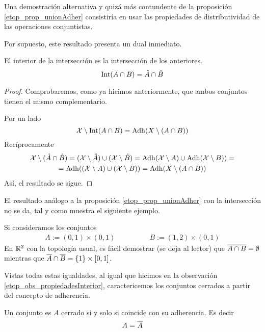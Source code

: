 \begin{obs}
	Una demostración alternativa y quizá más contundente de la proposición \ref{etop_prop_unionAdher} consistiría en usar las propiedades de distributividad de las operaciones conjuntistas.
\end{obs}
Por supuesto, este resultado presenta un dual inmediato.
\begin{cor}
	El interior de la intersección es la intersección de los anteriores.
	\begin{equation*}
	\operatorname{\mathrm{Int}}(A\cap B)=\mathring{A}\cap\mathring{B}
	\end{equation*}
\end{cor}
\begin{proof}
	Comprobaremos, como ya hicimos anteriormente, que ambos conjuntos tienen el mismo complementario.
	
	Por un lado
	\begin{equation*}
	\mathcal{X} \setminus \operatorname{\mathrm{Int}}(A\cap B)=\operatorname{\mathrm{Adh}}(X\setminus (A\cap B))
	\end{equation*}
	Recíprocamente
	\begin{multline*}
	\mathcal{X} \setminus (\mathring{A}\cap \mathring{B})=(\mathcal{X} \setminus \mathring{A})\cup(\mathcal{X} \setminus \mathring{B})=\operatorname{\mathrm{Adh}}(\mathcal{X} \setminus A)\cup \operatorname{\mathrm{Adh}}(\mathcal{X} \setminus B))=\\=\operatorname{\mathrm{Adh}}((\mathcal{X} \setminus A) \cup (\mathcal{X} \setminus B))=\operatorname{\mathrm{Adh}}(X\setminus (A\cap B))
	\end{multline*}
	Así, el resultado se sigue.
\end{proof}
El resultado análogo a la proposición \ref{etop_prop_unionAdher} con la intersección no se da, tal y como muestra el siguiente ejemplo.
\begin{exa}
	\label{etop_ejem_cuadradosAbiertos}
	Si consideramos los conjuntos
	\begin{equation*}
	\begin{array}{cc}
	A:=(0,1)\times(0,1)\qquad&\qquad B:=(1,2)\times(0,1)
	\end{array}
	\end{equation*}
	En $\mathbb{R}^2$ con la topología usual, es fácil demostrar (se deja al lector) que $\overline{A\cap B}=\emptyset$ mientras que $\overline{A}\cap\overline{B}=\{1\}\times[0,1]$.
\end{exa}
Vistas todas estas igualdades, al igual que hicimos en la observación \ref{etop_obs_propiedadesInterior}, caractericemos los conjuntos cerrados a partir del concepto de adherencia.
\begin{prop}
	\label{etop_prop_cerradosAdher}
	Un conjunto es $A$ cerrado si y solo si coincide con su adherencia. Es decir
	\begin{equation*}
	A=\overline{A}
	\end{equation*}
\end{prop}
